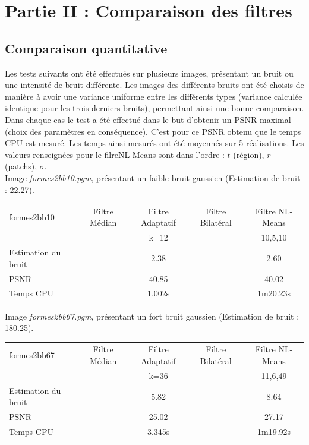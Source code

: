 \documentclass[a4,12pt]{article}
\begin{document}
\section{Partie II : Comparaison des filtres}
\subsection{Comparaison quantitative}

Les tests suivants ont été effectués sur plusieurs images, présentant un bruit ou une intensité de bruit différente. Les images des différents bruits ont été choisis de manière à avoir une variance uniforme entre les différents types (variance calculée identique pour les trois derniers bruits), permettant ainsi une bonne comparaison.\\

Dans chaque cas le test a été effectué dans le but d'obtenir un PSNR maximal (choix des paramètres en conséquence). C'est pour ce PSNR obtenu que le temps CPU est mesuré. Les temps ainsi mesurés ont été moyennés sur 5 réalisations. Les valeurs renseignées pour le filreNL-Means sont dans l'ordre : $t$ (région), $r$ (patchs), $\sigma$.\\

Image \textit{formes2bb10.pgm}, présentant un faible bruit gaussien (Estimation de bruit : 22.27).

\begin{center}
\begin{tabular}{|l||c|c|c|c|}
\hline
formes2bb10 & Filtre Médian & Filtre Adaptatif & Filtre Bilatéral & Filtre NL-Means \\
& & k=12 & & 10,5,10\\
\hline
Estimation du bruit
&
& 2.38
&
& 2.60\\
\hline
PSNR
&
& 40.85
&
& 40.02\\
\hline
Temps CPU
& 
& 1.002s
&
& 1m20.23s\\
\hline
\end{tabular} 
\end{center}

\vspace{2em}

Image \textit{formes2bb67.pgm}, présentant un fort bruit gaussien (Estimation de bruit : 180.25).

\begin{center}
\begin{tabular}{|l||c|c|c|c|}
\hline
formes2bb67 & Filtre Médian & Filtre Adaptatif & Filtre Bilatéral & Filtre NL-Means\\
& & k=36 & & 11,6,49\\
\hline
Estimation du bruit
&
& 5.82
&
& 8.64\\
\hline
PSNR
&
& 25.02
&
& 27.17\\
\hline
Temps CPU
&
& 3.345s
&
& 1m19.92s\\
\hline
\end{tabular} 
\end{center}
\end{document}
